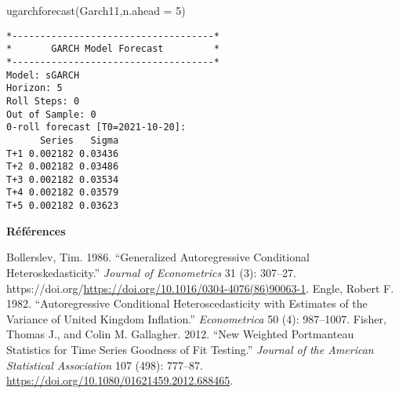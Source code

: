 \documentclass[
  ignorenonframetext,
]{beamer}
\newenvironment{Shaded}{\begin{snugshade}}{\end{snugshade}}
\newcommand{\AttributeTok}[1]{\textcolor[rgb]{0.77,0.63,0.00}{#1}}
\newcommand{\DecValTok}[1]{\textcolor[rgb]{0.00,0.00,0.81}{#1}}
\newcommand{\FunctionTok}[1]{\textcolor[rgb]{0.00,0.00,0.00}{#1}}
\newcommand{\NormalTok}[1]{#1}
\newlength{\cslhangindent}
\newlength{\cslentryspacingunit} %
\newenvironment{CSLReferences}[2] %
 {%
  \setlength{\parindent}{0pt}
  \ifodd #1
  \let\oldpar\par
  \def\par{\hangindent=\cslhangindent\oldpar}
  \fi
  \setlength{\parskip}{#2\cslentryspacingunit}
 }%
 {}
\newenvironment{Shaded}{\begin{snugshade}}{\end{snugshade}}
\newcommand{\AttributeTok}[1]{\textcolor[rgb]{0.77,0.63,0.00}{#1}}
\newcommand{\DecValTok}[1]{\textcolor[rgb]{0.00,0.00,0.81}{#1}}
\newcommand{\FunctionTok}[1]{\textcolor[rgb]{0.00,0.00,0.00}{#1}}
\newcommand{\NormalTok}[1]{#1}
\newlength{\cslhangindent}
\newlength{\cslentryspacingunit} %
\newenvironment{CSLReferences}[2] %
 {%
  \setlength{\parindent}{0pt}
  \ifodd #1
  \let\oldpar\par
  \def\par{\hangindent=\cslhangindent\oldpar}
  \fi
  \setlength{\parskip}{#2\cslentryspacingunit}
 }%
 {}
\begin{document}
\begin{frame}[fragile]
\begin{Shaded}
\begin{Highlighting}[]
\FunctionTok{ugarchforecast}\NormalTok{(Garch11,}\AttributeTok{n.ahead =} \DecValTok{5}\NormalTok{)}
\end{Highlighting}
\end{Shaded}
\begin{verbatim}
*------------------------------------*
*       GARCH Model Forecast         *
*------------------------------------*
Model: sGARCH
Horizon: 5
Roll Steps: 0
Out of Sample: 0
0-roll forecast [T0=2021-10-20]:
      Series   Sigma
T+1 0.002182 0.03436
T+2 0.002182 0.03486
T+3 0.002182 0.03534
T+4 0.002182 0.03579
T+5 0.002182 0.03623
\end{verbatim}
\end{frame}
\begin{frame}
\textbf{Références}
\hypertarget{refs}{}
\begin{CSLReferences}{1}{0}
\leavevmode{}%
Bollerslev, Tim. 1986. {``Generalized Autoregressive Conditional
Heteroskedasticity.''} \emph{Journal of Econometrics} 31 (3): 307--27.
https://doi.org/\url{https://doi.org/10.1016/0304-4076(86)90063-1}.
\leavevmode{}%
Engle, Robert F. 1982. {``Autoregressive Conditional Heteroscedasticity
with Estimates of the Variance of United Kingdom Inflation.''}
\emph{Econometrica} 50 (4): 987--1007.
\leavevmode{}%
Fisher, Thomas J., and Colin M. Gallagher. 2012. {``New Weighted
Portmanteau Statistics for Time Series Goodness of Fit Testing.''}
\emph{Journal of the American Statistical Association} 107 (498):
777--87. \url{https://doi.org/10.1080/01621459.2012.688465}.
\end{CSLReferences}
\end{frame}
\end{document}
